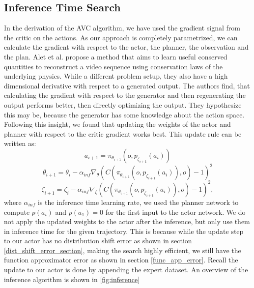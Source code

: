 \subsection{Inference Time Search}
\label{sec:inf_time_search}
In the derivation of the AVC algorithm, we have used the gradient signal from the critic on the actions. As our approach is completely parametrized, we can calculate 
the gradient with respect to the actor, the planner, the observation and the plan. Alet et al. \cite{alet2021noether} propose a method that aims 
to learn useful conserved quantities to reconstruct a video sequence 
using conservation laws of the underlying physics. While a different problem setup, they also have a high dimensional derivative with respect to a 
generated output. The authors find, that 
calculating the gradient with respect to the generator and then regenerating the output performs better, then directly optimizing the output. They hypothesize this 
may be, because the generator has some knowledge about the action space. Following this insight, we found that updating the weights of the actor and planner 
with respect to the critic gradient works best. This update rule can be written as:
\begin{equation*}
    a_{i+1} = \pi_{\theta_{i+1}}(o, p_{\zeta_{i+1}}(a_i))
\end{equation*}
\begin{equation*}
    \theta_{i+1} = \theta_i - \alpha_{inf} \nabla_{\theta} (C(\pi_{\theta_{i+1}}(o, p_{\zeta_{i+1}}(a_i)), o) - 1)^2
\end{equation*}
\begin{equation}
    \zeta_{i+1} = \zeta_i - \alpha_{inf} \nabla_{\zeta} (C(\pi_{\theta_{i+1}}(o, p_{\zeta_{i+1}}(a_i)), o) - 1)^2,
\end{equation}
where $\alpha_{inf}$ is the inference time learning rate, we used the planner network to compute $p(a_i)$ and $p(a_1) = 0$ for the first input to the actor network. 
We do not apply the updated weights to the actor after the inference, but only use them in inference time for the given trajectory. This is because while the update step to our 
actor has no distribution shift error as shown in section \ref{dist_shift_error_section}, making the search highly efficient, we still have the function approximator error as 
shown in section \ref{func_app_error}. Recall the update to our actor is done by appending the expert dataset. An overview of the inference 
algorithm is shown in \ref{fig:inference}

